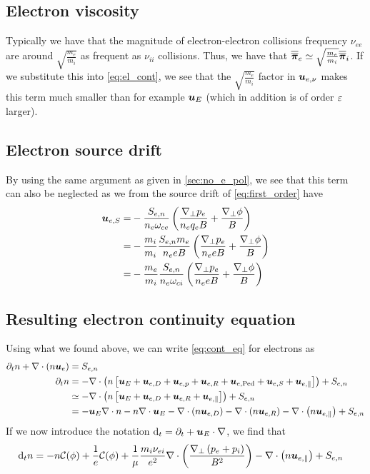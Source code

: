 \subsection{Electron viscosity}
%
Typically we have that the magnitude of electron-electron collisions frequency $\nu_{ee}$ are around $\sqrt{\frac{m_e}{m_i}}$ as frequent as $\nu_{ii}$ collisions.
Thus, we have that $\boldsymbol{\overline{\overline{\pi}}}_e \simeq \sqrt{\frac{m_e}{m_i}}\boldsymbol{\overline{\overline{\pi}}}_i$.
If we substitute this into \cref{eq:el_cont}, we see that the $\sqrt{\frac{m_e}{m_i}}$ factor in $\boldsymbol{u}_{e, \nu}$ makes this term much smaller than for example $\boldsymbol{u}_E$ (which in addition is of order $\varepsilon$ larger).

\subsection{Electron source drift}
\label{sec:no_e_source}
%
By using the same argument as given in \cref{sec:no_e_pol}, we see that this term can also be neglected as we from the source drift of \cref{eq:first_order} have
%
\begin{align*}
    \ve{u}_{e,S}
    =&
  - \frac{ S_{e,n}}{n_e \om_{ce}}
  \L( \frac{\grad_\perp p_e}{n_e q_e B}
  + \frac{\grad_\perp \phi}{B} \R)
  \\
%
  =&
  - \frac{m_i}{m_i}
  \frac{ S_{e,n} m_e}{n_e e B} \L(
   \frac{\grad_\perp p_e}{n_e e B}
  + \frac{\grad_\perp \phi}{B} \R)
  \\
%
  =&
  - \frac{m_e}{m_i} \frac{ S_{e,n}}{n_e \om_{ci}} \L(
  \frac{\grad_\perp p_e}{n_e e B}
  + \frac{\grad_\perp \phi}{B}
  \R)
\end{align*}

\subsection{Resulting electron continuity equation}
%
Using what we found above, we can write \cref{eq:cont_eq} for electrons as
%
\begin{align*}
    \partial_t n + \div\L(n\ve{u}_e\R)
    &= S_{e,n}
    \\
%
    \partial_t n
    &=
    - \div\L(n\L[ \ve{u}_E
    + \ve{u}_{e,D}
    + \ve{u}_{e,p}
    + \ve{u}_{e,R}
    + \ve{u}_{e,\text{Ped}}
    + \ve{u}_{e,S}
    + \ve{u}_{e,\|} \R]\R)
    + S_{e,n}
    \\
%
    &\simeq
    - \div\L(n\L[\ve{u}_E + \ve{u}_{e,D} + \ve{u}_{e,R} + \ve{u}_{e,\|}\R]\R)
    + S_{e,n}
    \\
%
    &=
    - \ve{u}_E\nabla\cdot n
    - n\div\ve{u}_E
    - \div\L(n \ve{u}_{e,D}\R)
    - \div\L(n \ve{u}_{e,R}\R)
    - \div\L(n \ve{u}_{e,\|}\R)
    + S_{e,n}
\end{align*}
%
If we now introduce the notation $\text{d}_t = \partial_t + \boldsymbol{u}_E\cdot\nabla$, we find that
%
\begin{align}
    \text{d}_t n
    &=
    - n\mathcal{C}(\phi)
    + \frac{1}{e}\mathcal{C}(\phi)
    +\frac{1}{\mu}\frac{m_i\nu_{ei}}{e^2}
    \nabla\cdot\left( \frac{\nabla_\perp \left(p_e + p_i\right)}{B^2} \right)
    - \nabla\cdot\left(n \boldsymbol{u}_{e,\|}\right)
    + S_{e,n}
    \label{eq:dens_evol_gen}
\end{align}

